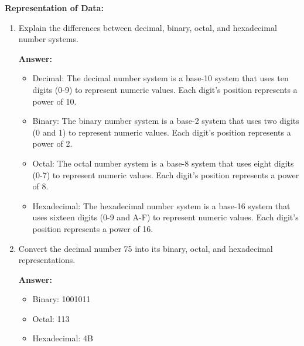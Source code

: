 \documentclass{article}
\begin{document}
\textbf{Representation of Data:}
\begin{enumerate}
    \item Explain the differences between decimal, binary, octal, and hexadecimal number systems.
    
    \textbf{Answer:}
    \begin{itemize}
        \item Decimal: The decimal number system is a base-10 system that uses ten digits (0-9) to represent numeric values. Each digit's position represents a power of 10.
        \item Binary: The binary number system is a base-2 system that uses two digits (0 and 1) to represent numeric values. Each digit's position represents a power of 2.
        \item Octal: The octal number system is a base-8 system that uses eight digits (0-7) to represent numeric values. Each digit's position represents a power of 8.
        \item Hexadecimal: The hexadecimal number system is a base-16 system that uses sixteen digits (0-9 and A-F) to represent numeric values. Each digit's position represents a power of 16.
    \end{itemize}

    \item Convert the decimal number 75 into its binary, octal, and hexadecimal representations.
    
    \textbf{Answer:}
    \begin{itemize}
        \item Binary: 1001011
        \item Octal: 113
        \item Hexadecimal: 4B
    \end{itemize}

\end{enumerate}
\end{document}
